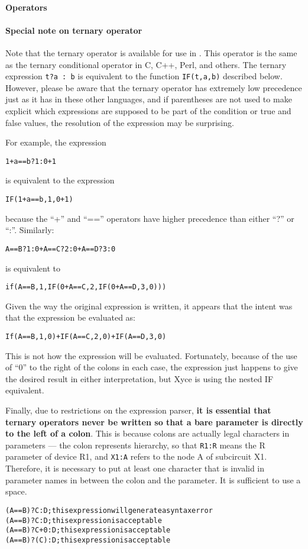 \paragraph{Operators}


\paragraph{Special note on ternary operator}
Note that the ternary operator is available for use in \Xyce{}.  This
operator is the same as the ternary conditional operator in C, C++,
Perl, and others.  The ternary expression \texttt{t?a : b} is
equivalent to the function \texttt{IF(t,a,b)} described below.
However, please be aware that the ternary operator has extremely low
precedence just as it has in these other languages, and if parentheses
are not used to make explicit which expressions are supposed to be
part of the condition or true and false values, the resolution of the
expression may be surprising.

For example, the expression
\begin{alltt}
  1+a==b?1:0+1
\end{alltt}
is equivalent to the expression
\begin{alltt}
  IF(1+a==b,1,0+1)
\end{alltt}
because the ``+'' and ``=='' operators have higher precedence than
either ``?'' or ``:''.  Similarly:
\begin{alltt}
  A==B?1:0 + A==C?2:0 + A==D?3:0
\end{alltt}
is equivalent to
\begin{alltt}
  if(A==B,1,IF(0 + A==C,2,IF(0 + A==D,3,0)))
\end{alltt}
Given the way the original expression is written, it appears that the
intent was that the expression be evaluated as:
\begin{alltt}
  If(A==B,1,0) + IF(A==C,2,0) + IF(A==D,3,0)
\end{alltt}
This is not how the expression will be evaluated.  Fortunately,
because of the use of ``0'' to the right of the colons in each case,
the expression just happens to give the desired result in either
interpretation, but Xyce is using the nested IF equivalent.

Finally, due to restrictions on the expression parser, {\bf it is essential
that ternary operators never be written so that a bare parameter is
directly to the left of a colon}.  This is because colons are actually
legal characters in parameters --- the colon represents hierarchy, so
that \texttt{R1:R} means the R parameter of device R1, and
\texttt{X1:A} refers to the node A of subcircuit X1.  Therefore, it is
necessary to put at least one character that is invalid in parameter names
in between the colon and the parameter.  It is sufficient to use a space.
\begin{alltt}
    {\color{red} (A==B)?C:D}  ; this expression will generate a syntax error
    {(A==B)?C :D}  ; this expression is acceptable
    {(A==B)?C+0:D}  ; this expression is acceptable
    {(A==B)?(C):D}  ; this expression is acceptable
\end{alltt}

